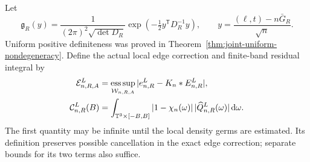 Let
\[
 \mathfrak g_R(y)=\frac{1}{(2\pi)^2\sqrt{\det D_R}}
                    \exp\!\left(-\tfrac12 y^{\mathsf T}D_R^{-1}y\right),
 \qquad y=\frac{(\ell,t)-n\bar G_R}{\sqrt n}.
\]
Uniform positive definiteness was proved in
Theorem~\ref{thm:joint-uniform-nondegeneracy}. Define the actual local
edge correction and finite-band residual integral by
\begin{align*}
 \mathcal E_{n,R,A}^{L}
   &=\mathop{\rm ess\,sup}_{\mathcal W_{n,R,A}}
                   |e^L_{n,R}-K_n*E^L_{n,R}|,\\
 \mathcal C_{n,R}^{L}(B)
   &=\int_{\mathbb T^3\times[-B,B]}
               |1-\chi_n(\omega)|\,|\widehat Q^L_{n,R}(\omega)|\,\mathrm d\omega.
\end{align*}
The first quantity may be infinite until the local density germs are
estimated. Its definition preserves possible cancellation in the exact
edge correction; separate bounds for its two terms also suffice.

